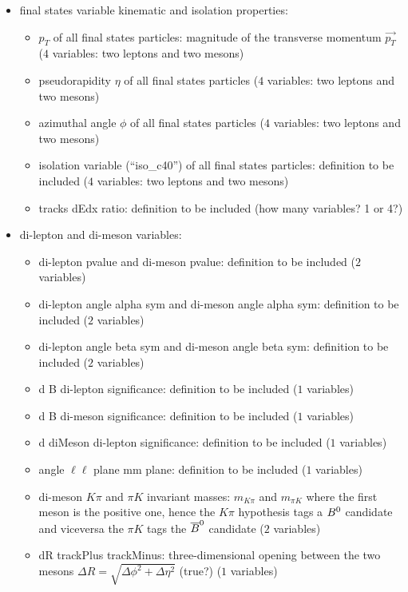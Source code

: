 \begin{itemize}
\item final states variable kinematic and isolation properties:
  \begin{itemize}
  \item $p_T$ of all final states particles: magnitude of the transverse momentum $\vec{p_T}$ ($4$ variables: two leptons and two mesons)
  \item pseudorapidity $\eta$ of all final states particles ($4$ variables: two leptons and two mesons)
  \item azimuthal angle $\phi$ of all final states particles ($4$ variables: two leptons and two mesons)
  \item isolation variable (``iso\_c40'') of all final states particles: definition to be included ($4$ variables: two leptons and two mesons)
  \item tracks dEdx ratio: definition to be included (how many variables? 1 or 4?)
  \end{itemize}
\item di-lepton and di-meson variables:
  \begin{itemize}
  \item di-lepton pvalue and di-meson pvalue: definition to be included ($2$ variables)
  \item di-lepton angle alpha sym and di-meson angle alpha sym: definition to be included ($2$ variables)
  \item di-lepton angle beta sym and di-meson angle beta sym: definition to be included ($2$ variables)
  \item d B di-lepton significance: definition to be included ($1$ variables)
  \item d B di-meson significance: definition to be included ($1$ variables)
  \item d diMeson di-lepton significance: definition to be included ($1$ variables)
  \item angle $\ell\ell$ plane mm plane: definition to be included ($1$ variables)
  \item di-meson $K\pi$ and $\pi K$ invariant masses: $m_{K\pi}$ and $m_{\pi K}$ where the first meson is the positive one,
    hence the $K\pi$ hypothesis tags a $\B0$ candidate and viceversa the $\pi K$ tags the $\overline{B}^0$ candidate ($2$ variables)
  \item dR trackPlus trackMinus: three-dimensional opening between the two mesons $\Delta R = \sqrt{\Delta\phi^2+\Delta\eta^2}$ (true?) ($1$ variables)
  \end{itemize}

\end{itemize}
